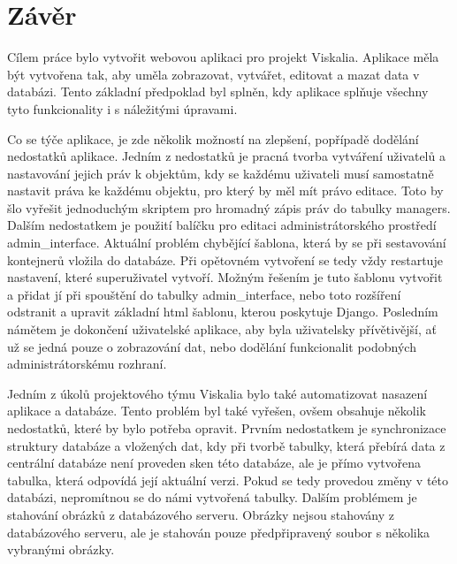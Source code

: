 \chapter{Závěr}
\label{5-zaver}


Cílem práce bylo vytvořit webovou aplikaci pro projekt
Viskalia. Aplikace měla být vytvořena tak, aby uměla zobrazovat,
vytvářet, editovat a mazat data v databázi. Tento základní předpoklad
byl splněn, kdy aplikace splňuje všechny tyto funkcionality i s
náležitými úpravami.

Co se týče aplikace, je zde několik možností na zlepšení, popřípadě
dodělání nedostatků aplikace. Jedním z nedostatků je pracná tvorba
vytváření uživatelů a nastavování jejich práv k objektům, kdy se
každému uživateli musí samostatně nastavit práva ke každému objektu,
pro který by měl mít právo editace. Toto by šlo vyřešit jednoduchým
skriptem pro hromadný zápis práv do tabulky managers. Dalším
nedostatkem je použití balíčku pro editaci administrátorského
prostředí admin\_interface. Aktuální problém chybějící šablona, která
by se při sestavování kontejnerů vložila do databáze. Při opětovném
vytvoření se tedy vždy restartuje nastavení, které superuživatel
vytvoří. Možným řešením je tuto šablonu vytvořit a přidat jí při
spouštění do tabulky admin\_interface, nebo toto rozšíření odstranit a
upravit základní html šablonu, kterou poskytuje Django. Posledním
námětem je dokončení uživatelské aplikace, aby byla uživatelsky
přívětivější, ať už se jedná pouze o zobrazování dat, nebo dodělání
funkcionalit podobných administrátorskému rozhraní.

Jedním z úkolů projektového týmu Viskalia bylo také automatizovat
nasazení aplikace a databáze. Tento problém byl také vyřešen, ovšem
obsahuje několik nedostatků, které by bylo potřeba opravit. Prvním
nedostatkem je synchronizace struktury databáze a vložených dat, kdy
při tvorbě tabulky, která přebírá data z centrální databáze není
proveden sken této databáze, ale je přímo vytvořena tabulka, která
odpovídá její aktuální verzi. Pokud se tedy provedou změny v této
databázi, nepromítnou se do námi vytvořená tabulky. Dalším problémem
je stahování obrázků z databázového serveru. Obrázky nejsou stahovány
z databázového serveru, ale je stahován pouze předpřipravený soubor s
několika vybranými obrázky.
